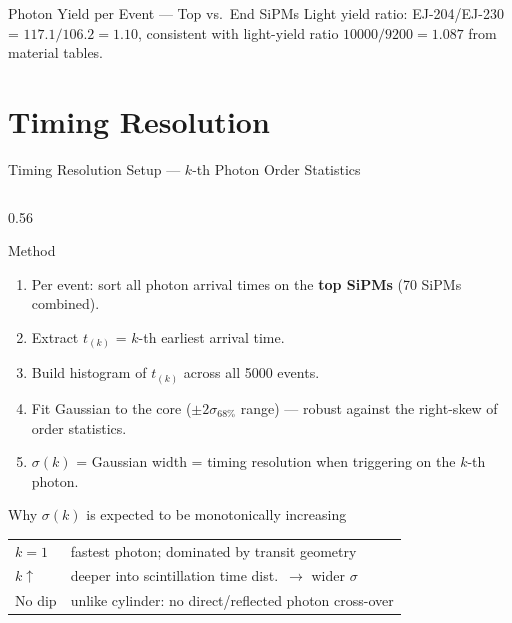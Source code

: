 \documentclass[aspectratio=169,10pt]{beamer}
\begin{document}
\begin{frame}{Photon Yield per Event --- Top vs.\ End SiPMs}
\vspace{0.5em}
{\footnotesize
Light yield ratio: EJ-204/EJ-230 = $117.1/106.2 = 1.10$, consistent with
light-yield ratio $10000/9200 = 1.087$ from material tables.
}

\end{frame}

\section{Timing Resolution}

\begin{frame}{Timing Resolution Setup --- $k$-th Photon Order Statistics}

\begin{columns}[T]
  \begin{column}{0.56\textwidth}
  \begin{block}{Method}
    \begin{enumerate}\setlength\itemsep{0.25em}
      \item Per event: sort all photon arrival times on the \textbf{top SiPMs}
            (70 SiPMs combined).
      \item Extract $t_{(k)}$ = $k$-th earliest arrival time.
      \item Build histogram of $t_{(k)}$ across all 5000 events.
      \item Fit Gaussian to the core ($\pm 2\sigma_{68\%}$ range) ---
            robust against the right-skew of order statistics.
      \item $\sigma(k)$ = Gaussian width = timing resolution when
            triggering on the $k$-th photon.
    \end{enumerate}
  \end{block}

  \vspace{0.4em}
  \begin{block}{Why $\sigma(k)$ is expected to be monotonically increasing}
  \small
  \begin{tabular}{@{}l@{$\;\Rightarrow\;$}l@{}}
    $k=1$ & fastest photon; dominated by transit geometry\\
    $k\uparrow$ & deeper into scintillation time dist.\ $\to$ wider $\sigma$ \\
    No dip & unlike cylinder: no direct/reflected photon cross-over \\
  \end{tabular}
  \end{block}
  \end{column}


\end{columns}
\end{frame}
\end{document}
